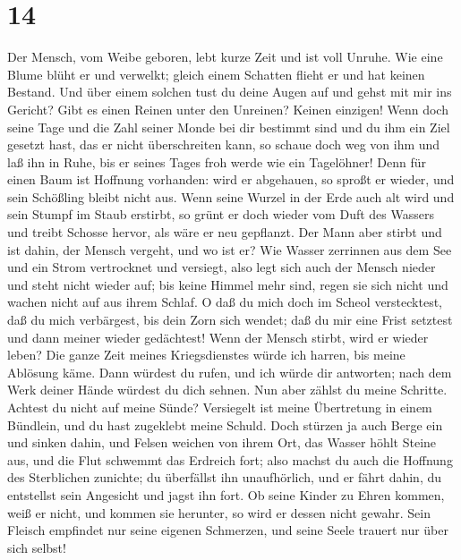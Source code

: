 \hypertarget{section-13}{%
\section{14}\label{section-13}}

 Der Mensch, vom Weibe geboren, lebt kurze Zeit und ist
voll Unruhe.  Wie eine Blume blüht er und verwelkt; gleich
einem Schatten flieht er und hat keinen Bestand.  Und über
einem solchen tust du deine Augen auf und gehst mit mir ins Gericht?
 Gibt es einen Reinen unter den Unreinen? Keinen einzigen!
 Wenn doch seine Tage und die Zahl seiner Monde bei dir
bestimmt sind und du ihm ein Ziel gesetzt hast, das er nicht
überschreiten kann,  so schaue doch weg von ihm und laß
ihn in Ruhe, bis er seines Tages froh werde wie ein Tagelöhner!
 Denn für einen Baum ist Hoffnung vorhanden: wird er
abgehauen, so sproßt er wieder, und sein Schößling bleibt nicht aus.
 Wenn seine Wurzel in der Erde auch alt wird und sein
Stumpf im Staub erstirbt,  so grünt er doch wieder vom
Duft des Wassers und treibt Schosse hervor, als wäre er neu gepflanzt.
 Der Mann aber stirbt und ist dahin, der Mensch vergeht,
und wo ist er?  Wie Wasser zerrinnen aus dem See und ein
Strom vertrocknet und versiegt,  also legt sich auch der
Mensch nieder und steht nicht wieder auf; bis keine Himmel mehr sind,
regen sie sich nicht und wachen nicht auf aus ihrem Schlaf.
 O daß du mich doch im Scheol verstecktest, daß du mich
verbärgest, bis dein Zorn sich wendet; daß du mir eine Frist setztest
und dann meiner wieder gedächtest!  Wenn der Mensch
stirbt, wird er wieder leben? Die ganze Zeit meines Kriegsdienstes würde
ich harren, bis meine Ablösung käme.  Dann würdest du
rufen, und ich würde dir antworten; nach dem Werk deiner Hände würdest
du dich sehnen.  Nun aber zählst du meine Schritte.
Achtest du nicht auf meine Sünde?  Versiegelt ist meine
Übertretung in einem Bündlein, und du hast zugeklebt meine Schuld.
 Doch stürzen ja auch Berge ein und sinken dahin, und
Felsen weichen von ihrem Ort, das Wasser höhlt Steine aus,
 und die Flut schwemmt das Erdreich fort; also machst du
auch die Hoffnung des Sterblichen zunichte;  du
überfällst ihn unaufhörlich, und er fährt dahin, du entstellst sein
Angesicht und jagst ihn fort.  Ob seine Kinder zu Ehren
kommen, weiß er nicht, und kommen sie herunter, so wird er dessen nicht
gewahr.  Sein Fleisch empfindet nur seine eigenen
Schmerzen, und seine Seele trauert nur über sich selbst!

